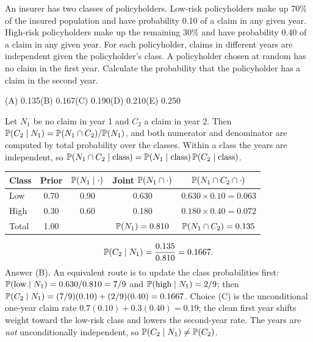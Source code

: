 \begin{example}
An insurer has two classes of policyholders. Low-risk policyholders make up 70\% of the
insured population and have probability 0.10 of a claim in any given year. High-risk
policyholders make up the remaining 30\% and have probability 0.40 of a claim in any given
year. For each policyholder, claims in different years are independent given the
policyholder's class. A policyholder chosen at random has no claim in the first year.
Calculate the probability that the policyholder has a claim in the second year.
\par\smallskip\noindent (A) 0.135\qquad (B) 0.167\qquad (C) 0.190\qquad (D) 0.210\qquad (E) 0.250
\end{example}
\begin{solution}
Let $N_1$ be no claim in year 1 and $C_2$ a claim in year 2. Then
$\mathbb{P}(C_2 \mid N_1) = \mathbb{P}(N_1 \cap C_2)/\mathbb{P}(N_1)$, and both numerator and denominator
are computed by total probability over the classes. Within a class the years are independent,
so $\mathbb{P}(N_1 \cap C_2 \mid \text{class}) = \mathbb{P}(N_1 \mid \text{class})\,\mathbb{P}(C_2 \mid \text{class})$.
\begin{center}
\begin{tabular}{@{}lcccc@{}}
\toprule
Class & Prior & $\mathbb{P}(N_1 \mid \cdot)$ & Joint $\mathbb{P}(N_1 \cap \cdot)$ & $\mathbb{P}(N_1 \cap C_2 \cap \cdot)$ \\
\midrule
Low  & 0.70 & 0.90 & 0.630 & $0.630 \times 0.10 = 0.063$ \\
High & 0.30 & 0.60 & 0.180 & $0.180 \times 0.40 = 0.072$ \\
\midrule
Total & 1.00 & & $\mathbb{P}(N_1) = 0.810$ & $\mathbb{P}(N_1 \cap C_2) = 0.135$ \\
\bottomrule
\end{tabular}
\end{center}
\[
\mathbb{P}(C_2 \mid N_1) = \frac{0.135}{0.810} = 0.1667.
\]
Answer (B). An equivalent route is to update the class probabilities first:
$\mathbb{P}(\text{low} \mid N_1) = 0.630/0.810 = 7/9$ and $\mathbb{P}(\text{high} \mid N_1) = 2/9$; then
$\mathbb{P}(C_2 \mid N_1) = (7/9)(0.10) + (2/9)(0.40) = 0.1667$. Choice (C) is the unconditional
one-year claim rate $0.7(0.10) + 0.3(0.40) = 0.19$; the clean first year shifts weight toward
the low-risk class and lowers the second-year rate. The years are \emph{not} unconditionally
independent, so $\mathbb{P}(C_2 \mid N_1) \neq \mathbb{P}(C_2)$.
\end{solution}

